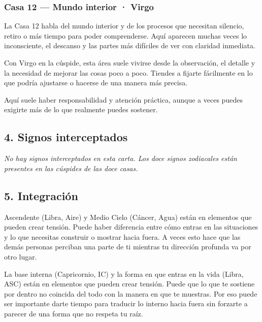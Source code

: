 \documentclass[11pt,a4paper]{article}
\begin{document}
\subsubsection*{Casa 12 — Mundo interior · Virgo}
La Casa 12 habla del mundo interior y de los procesos que necesitan silencio, retiro o más tiempo para poder comprenderse. Aquí aparecen muchas veces lo inconsciente, el descanso y las partes más difíciles de ver con claridad inmediata.

Con Virgo en la cúspide, esta área suele vivirse desde la observación, el detalle y la necesidad de mejorar las cosas poco a poco. Tiendes a fijarte fácilmente en lo que podría ajustarse o hacerse de una manera más precisa.

Aquí suele haber responsabilidad y atención práctica, aunque a veces puedes exigirte más de lo que realmente puedes sostener.



\vspace{0.5cm}

\subsection{4. Signos interceptados}

\textit{No hay signos interceptados en esta carta. Los doce signos zodiacales están presentes en las cúspides de las doce casas.}


\vspace{0.5cm}

\subsection{5. Integración}

Ascendente (Libra, Aire) y Medio Cielo (Cáncer, Agua) están en elementos que pueden crear tensión. Puede haber diferencia entre cómo entras en las situaciones y lo que necesitas construir o mostrar hacia fuera. A veces esto hace que las demás personas perciban una parte de ti mientras tu dirección profunda va por otro lugar.

La base interna (Capricornio, IC) y la forma en que entras en la vida (Libra, ASC) están en elementos que pueden crear tensión. Puede que lo que te sostiene por dentro no coincida del todo con la manera en que te muestras. Por eso puede ser importante darte tiempo para traducir lo interno hacia fuera sin forzarte a parecer de una forma que no respeta tu raíz.
\end{document}
